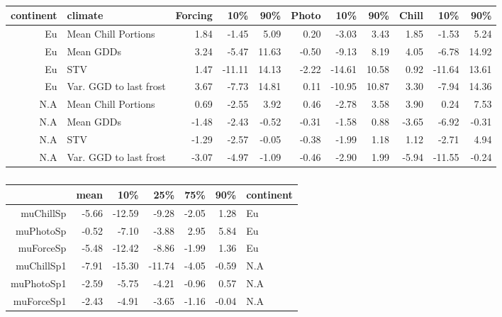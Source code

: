 \documentclass[12pt]{article}\usepackage[]{graphicx}\usepackage[]{color}
\begin{document}
\begin{table}
\centering
\begin{tabular}{|r|p{3 cm}|rrr|rrr|rrr|}
  \hline
  \hline
 continent & climate & Forcing & 10\% & 90\% & Photo & 10\% & 90\% & Chill & 10\% & 90\% \\ 
  \hline
 Eu & Mean Chill Portions & 1.84 & -1.45 & 5.09 & 0.20 & -3.03 & 3.43 & 1.85 & -1.53 & 5.24 \\ 
 \hline
    Eu & Mean GDDs & 3.24 & -5.47 & 11.63 & -0.50 & -9.13 & 8.19 & 4.05 & -6.78 & 14.92 \\ 
    \hline
    Eu & STV & 1.47 & -11.11 & 14.13 & -2.22 & -14.61 & 10.58 & 0.92 & -11.64 & 13.61 \\ 
    \hline
    Eu & Var. GGD to last frost & 3.67 & -7.73 & 14.81 & 0.11 & -10.95 & 10.87 & 3.30 & -7.94 & 14.36 \\ 
    \hline
    \hline
    N.A & Mean Chill Portions & 0.69 & -2.55 & 3.92 & 0.46 & -2.78 & 3.58 & 3.90 & 0.24 & 7.53 \\ 
    \hline
    N.A & Mean GDDs & -1.48 & -2.43 & -0.52 & -0.31 & -1.58 & 0.88 & -3.65 & -6.92 & -0.31 \\ 
    \hline
    N.A & STV & -1.29 & -2.57 & -0.05 & -0.38 & -1.99 & 1.18 & 1.12 & -2.71 & 4.94 \\ 
    \hline
    N.A & Var. GGD to last frost & -3.07 & -4.97 & -1.09 & -0.46 & -2.90 & 1.99 & -5.94 & -11.55 & -0.24 \\ 
  \hline
   \hline
\end{tabular}
\label{tab:outcont}
\caption{}
\end{table}

\begin{table}[ht]
\centering
\begin{tabular}{rrrrrrl}
  \hline
 & mean & 10\% & 25\% & 75\% & 90\% & continent \\ 
  \hline
muChillSp & -5.66 & -12.59 & -9.28 & -2.05 & 1.28 & Eu \\ 
  muPhotoSp & -0.52 & -7.10 & -3.88 & 2.95 & 5.84 & Eu \\ 
  muForceSp & -5.48 & -12.42 & -8.86 & -1.99 & 1.36 & Eu \\ 
  muChillSp1 & -7.91 & -15.30 & -11.74 & -4.05 & -0.59 & N.A \\ 
  muPhotoSp1 & -2.59 & -5.75 & -4.21 & -0.96 & 0.57 & N.A \\ 
  muForceSp1 & -2.43 & -4.91 & -3.65 & -1.16 & -0.04 & N.A \\ 
   \hline
\end{tabular}
\caption{}
\end{table}
\fi 
\end{document}
